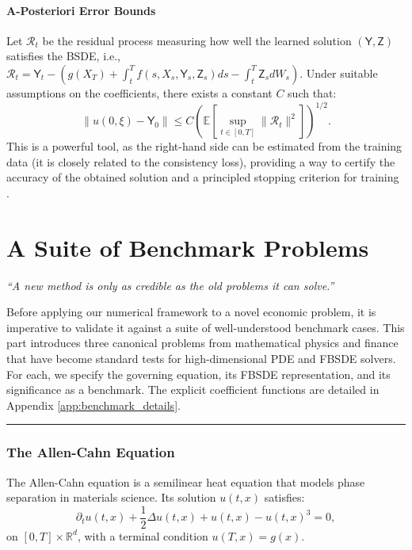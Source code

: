 \subsection{A-Posteriori Error Bounds}
\begin{theorem}
Let \(\mathcal{R}_t\) be the residual process measuring how well the learned solution \((\mathsf{Y}, \mathsf{Z})\) satisfies the BSDE, i.e., \(\mathcal{R}_t = \mathsf{Y}_t - \left( g(X_T) + \int_t^T f(s, X_s, \mathsf{Y}_s, \mathsf{Z}_s) ds - \int_t^T \mathsf{Z}_s dW_s \right)\). Under suitable assumptions on the coefficients, there exists a constant \(C\) such that:
\[
  \|u(0,\xi)-\mathsf{Y}_0\| \le C \left( \mathbb{E}\left[\sup_{t\in [0,T]}\|\mathcal{R}_t\|^2\right] \right)^{1/2}.
\]
This is a powerful tool, as the right-hand side can be estimated from the training data (it is closely related to the consistency loss), providing a way to certify the accuracy of the obtained solution and a principled stopping criterion for training \cite{BenderSteiner2012}.
\end{theorem}

\clearpage
\newpage
\part{A Suite of Benchmark Problems}
\label{part:benchmarks}

\begin{center}
\textit{“A new method is only as credible as the old problems it can solve.”}
\end{center}

Before applying our numerical framework to a novel economic problem, it is imperative to validate it against a suite of well-understood benchmark cases. This part introduces three canonical problems from mathematical physics and finance that have become standard tests for high-dimensional PDE and FBSDE solvers. For each, we specify the governing equation, its FBSDE representation, and its significance as a benchmark. The explicit coefficient functions are detailed in Appendix \ref{app:benchmark_details}.

\bigskip
\hrule
\bigskip

\section{The Allen-Cahn Equation}
\label{sec:allen_cahn}

\begin{definition}
The Allen-Cahn equation is a semilinear heat equation that models phase separation in materials science. Its solution \(u(t,x)\) satisfies:
\begin{equation}
    \partial_t u(t,x) + \frac{1}{2}\Delta u(t,x) + u(t,x) - u(t,x)^3 = 0,
\end{equation}
on \([0,T] \times \mathbb{R}^d\), with a terminal condition \(u(T,x) = g(x)\).
\end{definition}

